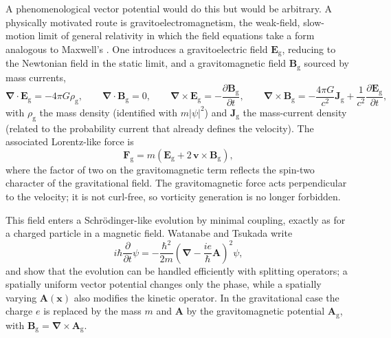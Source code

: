 \documentclass[11pt,a4paper]{article}
\newcommand{\grad}{\bm{\nabla}}
\newcommand{\Bg}{\mathbf{B}_{\mathrm{g}}}
\newcommand{\Eg}{\mathbf{E}_{\mathrm{g}}}
\begin{document}
A phenomenological vector potential would do this but would be arbitrary. A physically
motivated route is gravitoelectromagnetism, the weak-field, slow-motion limit of
general relativity in which the field equations take a form analogous to Maxwell's
\citep{mashhoon2003}. One introduces a gravitoelectric field $\Eg$, reducing to the
Newtonian field in the static limit, and a gravitomagnetic field $\Bg$ sourced by mass
currents,
%
\begin{equation}
  \grad\cdot\Eg = -4\pi G \rho_{\mathrm{g}}, \qquad
  \grad\cdot\Bg = 0, \qquad
  \grad\times\Eg = -\frac{\partial \Bg}{\partial t}, \qquad
  \grad\times\Bg = -\frac{4\pi G}{c^2}\mathbf{J}_{\mathrm{g}}
  + \frac{1}{c^2}\frac{\partial \Eg}{\partial t},
\end{equation}
%
with $\rho_{\mathrm{g}}$ the mass density (identified with $m|\psi|^2$) and
$\mathbf{J}_{\mathrm{g}}$ the mass-current density (related to the probability current
that already defines the velocity). The associated Lorentz-like force is
%
\begin{equation}
  \mathbf{F}_{\mathrm{g}} = m\left( \Eg + 2\,\mathbf{v}\times\Bg \right),
  \label{eq:gem-lorentz}
\end{equation}
%
where the factor of two on the gravitomagnetic term reflects the spin-two character of
the gravitational field. The gravitomagnetic force acts perpendicular to the velocity;
it is not curl-free, so vorticity generation is no longer forbidden.

This field enters a Schr\"odinger-like evolution by minimal coupling, exactly as for a
charged particle in a magnetic field. Watanabe and Tsukada \citep{watanabe2000} write
%
\begin{equation}
  i\hbar\frac{\partial}{\partial t}\psi
  = -\frac{\hbar^2}{2m}\left(\grad - \frac{ie}{\hbar}\mathbf{A}\right)^2\psi,
\end{equation}
%
and show that the evolution can be handled efficiently with splitting operators; a
spatially uniform vector potential changes only the phase, while a spatially varying
$\mathbf{A}(\mathbf{x})$ also modifies the kinetic operator. In the gravitational case
the charge $e$ is replaced by the mass $m$ and $\mathbf{A}$ by the gravitomagnetic
potential $\mathbf{A}_{\mathrm{g}}$, with $\Bg = \grad\times\mathbf{A}_{\mathrm{g}}$.
\end{document}
